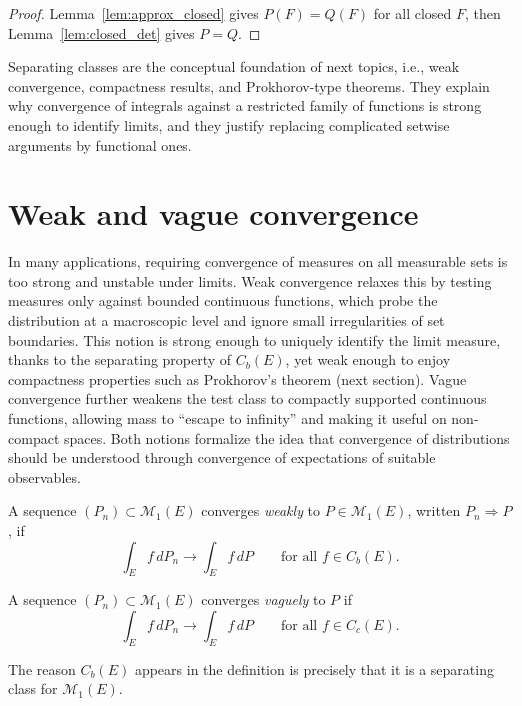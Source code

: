 \begin{proof}
Lemma~\ref{lem:approx_closed} gives $P(F)=Q(F)$ for all closed $F$, then Lemma~\ref{lem:closed_det} gives $P=Q$.
\end{proof}

Separating classes are the conceptual foundation of next topics, i.e., weak convergence,
compactness results, and Prokhorov-type theorems.
They explain why convergence of integrals against a restricted family of functions
is strong enough to identify limits,
and they justify replacing complicated setwise arguments by functional ones.

\section{Weak and vague convergence}

In many applications, requiring convergence of measures on all measurable sets is too strong and unstable under limits.
Weak convergence relaxes this by testing measures only against bounded continuous functions, which probe the distribution at a macroscopic level and ignore small irregularities of set boundaries.
This notion is strong enough to uniquely identify the limit measure, thanks to the separating property of $C_b(E)$, yet weak enough to enjoy compactness properties such as Prokhorov’s theorem (next section).
Vague convergence further weakens the test class to compactly supported continuous functions, allowing mass to ``escape to infinity'' and making it useful on non-compact spaces.
Both notions formalize the idea that convergence of distributions should be understood through convergence of expectations of suitable observables.

\begin{definition}
A sequence $(P_n)\subset\mathcal{M}_1(E)$ converges \emph{weakly} to $P\in\mathcal{M}_1(E)$, written $P_n\Rightarrow P$, if
\[
\int_E f\,dP_n \longrightarrow \int_E f\,dP
\qquad\text{for all } f\in C_b(E).
\]
\end{definition}

\begin{definition}
A sequence $(P_n)\subset\mathcal{M}_1(E)$ converges \emph{vaguely} to $P$ if
\[
\int_E f\,dP_n \longrightarrow \int_E f\,dP
\qquad\text{for all } f\in C_c(E).
\]
\end{definition}

\begin{remark}
The reason $C_b(E)$ appears in the definition is precisely that it is a separating class for $\mathcal{M}_1(E)$.
\end{remark}

